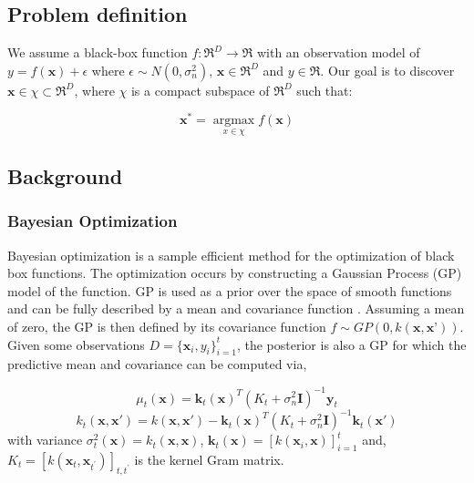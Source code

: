 \documentclass{article}
\begin{document}
\subsection{Problem definition}

We assume a black-box function $f:  \Re^{D}\rightarrow \Re$ with an observation model of $y=f(\textbf{x})+\epsilon$ where $\epsilon \sim N(0,\sigma_{n}^{2})$, $\textbf{x} \in \Re^{D}$ and $y \in \Re$. Our goal is to discover  $\textbf{x} \in \chi \subset \Re^{D}$, where $\chi$ is a compact subspace of $\Re^{D}$ such that:

\begin{equation}\label{eq:BO_optimiser}
\textbf{x}^{*} = \operatorname*{argmax}_{x\in \chi}  f(\textbf{x})
\end{equation}

\subsection{Background}
\subsubsection{Bayesian Optimization}
Bayesian optimization is a sample efficient method for the optimization of black box functions. The optimization occurs by constructing a Gaussian Process (GP) model of the function. GP is used as a prior over the space of smooth functions and can be fully described by a mean and covariance function \cite{Rasmussen:2005:GPM:1162254}. Assuming a mean of zero, the GP is then defined by its covariance function $f \sim GP(0,k(\textbf{x},\textbf{x'}))$. Given some observations $D = \{\textbf{x}_i,y_i\}_{i=1}^{t}$, the posterior is also a GP for which the predictive mean and covariance can be computed via,

\begin{equation} \label{eq:mu}
\mu_{t}(\textbf{x}) = \textbf{k}_{t}(\textbf{x})^T(K_{t} + \sigma_{n}^2\mathbf{I})^{-1}\textbf{y}_{t}
\end{equation}
\begin{equation} \label{eq:sigma}
k_{t}(\textbf{x},\textbf{x}') = k(\textbf{x},\textbf{x}') - \textbf{k}_t(\textbf{x})^T(K_t + \sigma_{n}^2\mathbf{I})^{-1}\textbf{k}_t(\textbf{x}')
\end{equation}
with variance $\sigma_{t}^2(\textbf{x}) = k_{t}(\textbf{x},\textbf{x})$, $\textbf{k}_t(\textbf{x}) = [k(\textbf{x}_i,\textbf{x})]_{i=1}^t$ and, $K_t = [k(\textbf{x}_t,\textbf{x}_{t^{'}})]_{t,t^{'}}$ is the kernel Gram matrix.
\end{document}
